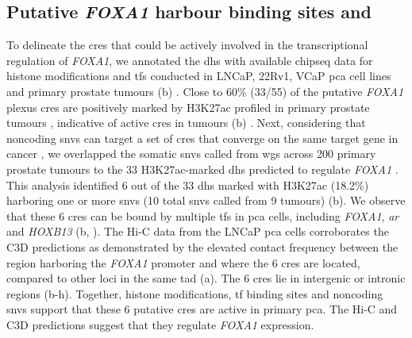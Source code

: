 
\subsection{Putative \emph{FOXA1}  harbour  binding sites and }

To delineate the \glspl{cre} that could be actively involved in the transcriptional regulation of \emph{FOXA1}, we annotated the \gls{dhs} with available \gls{chipseq} data for histone modifications and \glspl{tf} conducted in LNCaP, 22Rv1, VCaP \gls{pca} cell lines and primary prostate tumours (b) \cite{pomerantzAndrogenReceptorCistrome2015,kronTMPRSS2ERGFusion2017}.
Close to 60\% (33/55) of the putative \emph{FOXA1} plexus \glspl{cre} are positively marked by H3K27ac profiled in primary prostate tumours \cite{kronTMPRSS2ERGFusion2017}, indicative of active \glspl{cre} in tumours (b) \cite{creyghtonHistoneH3K27acSeparates2010}.
Next, considering that noncoding \Glspl{snv} can target a set of \glspl{cre} that converge on the same target gene in cancer \cite{baileyNoncodingSomaticInherited2016}, we overlapped the somatic \Glspl{snv} called from \gls{wgs} across 200 primary prostate tumours to the 33 H3K27ac-marked \gls{dhs} predicted to regulate \emph{FOXA1} \cite{fraserGenomicHallmarksLocalized2017,espirituEvolutionaryLandscapeLocalized2018}.
This analysis identified 6 out of the 33 \gls{dhs} marked with H3K27ac (18.2\%) harboring one or more \glspl{snv} (10 total \glspl{snv} called from 9 tumours) (b).
We observe that these 6 \glspl{cre} can be bound by multiple \glspl{tf} in \gls{pca} cells, including \emph{FOXA1}, \emph{\gls{ar}} and \emph{HOXB13} (b, ).
The Hi-C data from the LNCaP \gls{pca} cells corroborates the C3D predictions as demonstrated by the elevated contact frequency between the region harboring the \emph{FOXA1} promoter and where the 6 \glspl{cre} are located, compared to other loci in the same \gls{tad} (a).
The 6 \glspl{cre} lie in intergenic or intronic regions (b-h).
Together, histone modifications, \gls{tf} binding sites and noncoding \glspl{snv} support that these 6 putative \glspl{cre} are active in primary \gls{pca}.
The Hi-C and C3D predictions suggest that they regulate \emph{FOXA1} expression.

